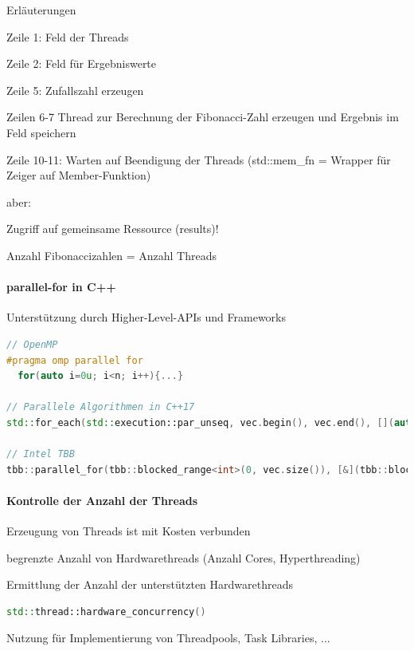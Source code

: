 \documentclass[10pt]{article}
\begin{document}
  Erläuterungen
  \begin{itemize*}
    \item Zeile 1: Feld der Threads
    \item Zeile 2: Feld für Ergebniswerte
    \item Zeile 5: Zufallszahl erzeugen
    \item Zeilen 6-7 Thread zur Berechnung der Fibonacci-Zahl erzeugen und Ergebnis im Feld speichern
    \item Zeile 10-11: Warten auf Beendigung der Threads (std::mem\_fn = Wrapper für Zeiger auf Member-Funktion)
    \item \color{orange} aber: \color{black}
    \begin{itemize*}
      \item Zugriff auf gemeinsame Ressource (results)!
      \item Anzahl Fibonaccizahlen = Anzahl Threads
    \end{itemize*}
  \end{itemize*}
  
  \paragraph{parallel-for in C++}
  
  \begin{itemize*}
    \item Unterstützung durch Higher-Level-APIs und Frameworks
  \end{itemize*}
  \begin{lstlisting}[language=C++]
// OpenMP
#pragma omp parallel for
  for(auto i=0u; i<n; i++){...}

// Parallele Algorithmen in C++17
std::for_each(std::execution::par_unseq, vec.begin(), vec.end(), [](auto&& item) {...});

// Intel TBB
tbb::parallel_for(tbb::blocked_range<int>(0, vec.size()), [&](tbb::blocked_range<int> r){...});
\end{lstlisting}
  
  \paragraph{Kontrolle der Anzahl der Threads}
  
  \begin{itemize*}
    \item Erzeugung von Threads ist mit Kosten verbunden
    \item begrenzte Anzahl von Hardwarethreads (Anzahl Cores, Hyperthreading)
    \item Ermittlung der Anzahl der unterstützten Hardwarethreads
  \end{itemize*}
  \begin{lstlisting}[language=C++]
std::thread::hardware_concurrency()
\end{lstlisting}
  \begin{itemize*}
    \item Nutzung für Implementierung von Threadpools, Task Libraries, ...
  \end{itemize*}
  
\end{document}
